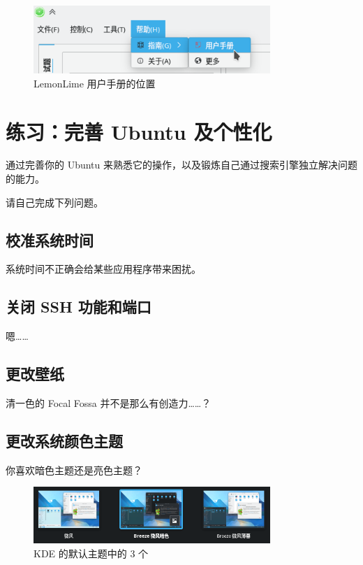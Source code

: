 \documentclass[UTF-8]{ctexart}
\begin{document}
				\begin{figure}[H]
					\centering
					\includegraphics[width=0.8\textwidth]{fig/lemonlime_manual.png}
					\caption*{LemonLime 用户手册的位置}
				\end{figure}
			
	\newpage
			
	\section{练习：完善 Ubuntu 及个性化}
		
		通过完善你的 Ubuntu 来熟悉它的操作，以及锻炼自己通过搜索引擎独立解决问题的能力。
		
		请自己完成下列问题。
		
		\subsection{校准系统时间}
		
			系统时间不正确会给某些应用程序带来困扰。
			
		\subsection{关闭 SSH 功能和端口}
			
			嗯……
		
		\subsection{更改壁纸}
		
			清一色的 Focal Fossa 并不是那么有创造力……？
			
		\subsection{更改系统颜色主题}
			
			你喜欢暗色主题还是亮色主题？
			
			\begin{figure}[H]
				\centering
				\includegraphics[width=0.8\textwidth]{fig/kde_theme.png}
				\caption*{KDE 的默认主题中的 3 个}
			\end{figure}
		
\end{document}

